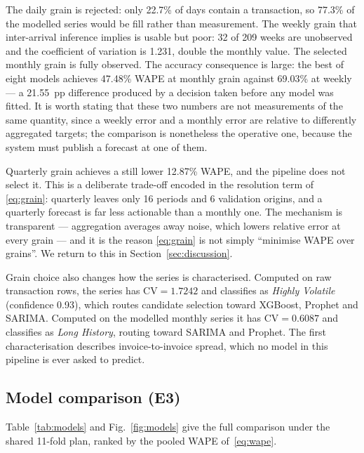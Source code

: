 \documentclass[conference]{IEEEtran}
\begin{document}
The daily grain is rejected: only 22.7\% of days contain a transaction, so
77.3\% of the modelled series would be fill rather than measurement. The
weekly grain that inter-arrival inference implies is usable but poor: 32 of
209 weeks are unobserved and the coefficient of variation is 1.231, double
the monthly value. The selected monthly grain is fully observed. The accuracy
consequence is large: the best of eight models achieves 47.48\% WAPE at
monthly grain against 69.03\% at weekly --- a 21.55~pp difference produced
by a decision taken before any model was fitted. It is worth stating that
these two numbers are not measurements of the same quantity, since a weekly
error and a monthly error are relative to differently aggregated targets; the
comparison is nonetheless the operative one, because the system must publish a
forecast at one of them.

Quarterly grain achieves a still lower 12.87\% WAPE, and the pipeline does not
select it. This is a deliberate trade-off encoded in the resolution term of
\eqref{eq:grain}: quarterly leaves only 16 periods and 6 validation origins,
and a quarterly forecast is far less actionable than a monthly one. The
mechanism is transparent --- aggregation averages away noise, which lowers
relative error at every grain --- and it is the reason \eqref{eq:grain} is not
simply ``minimise WAPE over grains''. We return to this in
Section~\ref{sec:discussion}.

Grain choice also changes how the series is characterised. Computed on raw
transaction rows, the series has $\mathrm{CV}=1.7242$ and classifies as
\emph{Highly Volatile} (confidence 0.93), which routes candidate selection
toward XGBoost, Prophet and SARIMA. Computed on the modelled monthly series it
has $\mathrm{CV}=0.6087$ and classifies as \emph{Long History}, routing toward
SARIMA and Prophet. The first characterisation describes invoice-to-invoice
spread, which no model in this pipeline is ever asked to predict.

\subsection{Model comparison (E3)}

Table~\ref{tab:models} and Fig.~\ref{fig:models} give the full comparison
under the shared 11-fold plan, ranked by the pooled WAPE of~\eqref{eq:wape}.
\end{document}
